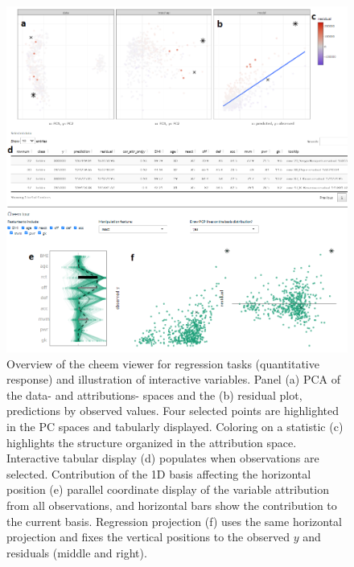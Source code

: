\documentclass[
]{sn-jnl}
\begin{document}
\begin{CodeChunk}
\begin{figure}

{\centering \includegraphics[width=1\linewidth]{./figures/app_regression_interactions} 

}

\caption[Overview of the cheem viewer for regression tasks (quantitative response) and illustration of interactive variables]{Overview of the cheem viewer for regression tasks (quantitative response) and illustration of interactive variables. Panel (a) PCA of the data- and attributions- spaces and the (b) residual plot, predictions by observed values. Four selected points are highlighted in the PC spaces and tabularly displayed. Coloring on a statistic (c) highlights the structure organized in the attribution space. Interactive tabular display (d) populates when observations are selected. Contribution of the 1D basis affecting the horizontal position (e) parallel coordinate display of the variable attribution from all observations, and horizontal bars show the contribution to the current basis. Regression projection (f) uses the same horizontal projection and fixes the vertical positions to the observed $y$ and residuals (middle and right).}\label{fig:regressioncase}
\end{figure}
\end{CodeChunk}
\end{document}

